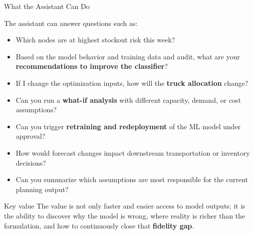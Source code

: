\begin{frame}{What the Assistant Can Do}

The assistant can answer questions such as:
\begin{itemize}
  \item Which nodes are at highest stockout risk this week?
  \item Based on the model behavior and training data and audit, what are your \textbf{recommendations to improve the classifier}?
  \item If I change the optimization inputs, how will the \textbf{truck allocation} change?
  \item Can you run a \textbf{what-if analysis} with different capacity, demand, or cost assumptions?
  \item Can you trigger \textbf{retraining and redeployment} of the ML model under approval?
  \item How would forecast changes impact downstream transportation or inventory decisions?
  \item Can you summarize which assumptions are most responsible for the current planning output?
\end{itemize}

\begin{block}{Key value}
The value is not only faster and easier access to model outputs; it is the ability to discover why the model is wrong, where reality is richer than the formulation, and how to continuously close that \textbf{fidelity gap}.
\end{block}

\end{frame}


